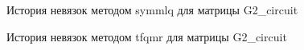 \begin{figure}[H]
    \renewcommand{\figurename}{Рисунок}
    \caption{История невязок методом symmlq для матрицы G2\_circuit}
    \label{fig:image_52}
\end{figure}

\begin{figure}[H]
    \renewcommand{\figurename}{Рисунок}
    \caption{История невязок методом tfqmr для матрицы G2\_circuit}
    \label{fig:image_53}
\end{figure}
